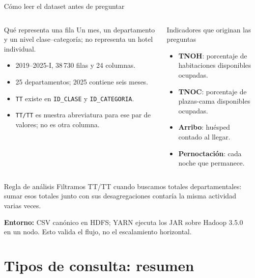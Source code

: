 \documentclass{beamer}
\begin{document}
\begin{frame}{Cómo leer el dataset antes de preguntar}
\footnotesize
\begin{columns}[T,onlytextwidth]
\begin{block}{Qué representa una fila}
Un mes, un departamento y un nivel clase--categoría; no representa un hotel individual.
\begin{itemize}
  \item 2019--2025-I, 38\,730 filas y 24 columnas.
  \item 25 departamentos; 2025 contiene seis meses.
  \item \texttt{TT} existe en \texttt{ID\_CLASE} y \texttt{ID\_CATEGORIA}.
  \item \texttt{TT/TT} es nuestra abreviatura para ese par de valores; no es otra columna.
\end{itemize}
\end{block}
\begin{block}{Indicadores que originan las preguntas}
\begin{itemize}
  \item \textbf{TNOH}: porcentaje de habitaciones disponibles ocupadas.
  \item \textbf{TNOC}: porcentaje de plazas-cama disponibles ocupadas.
  \item \textbf{Arribo}: huésped contado al llegar.
  \item \textbf{Pernoctación}: cada noche que permanece.
\end{itemize}
\end{block}
\end{columns}
\begin{alertblock}{Regla de análisis}
Filtramos TT/TT cuando buscamos totales departamentales: sumar esos totales junto con sus desagregaciones contaría la misma actividad varias veces.
\end{alertblock}
\textbf{Entorno:} CSV canónico en HDFS; YARN ejecuta los JAR sobre Hadoop 3.5.0 en un nodo. Esto valida el flujo, no el escalamiento horizontal.
\end{frame}

\section{Tipos de consulta: resumen}
\end{document}
